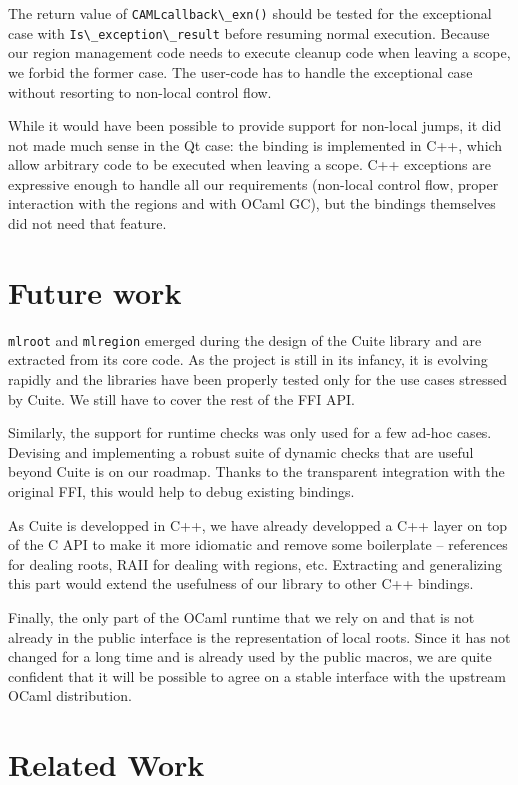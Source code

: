\documentclass[a4paper]{easychair}
\newcommand{\cpp}[1]{\lstinline[style=C++]{#1}}
\begin{document}
The return value of \cpp{CAMLcallback\_exn()} should be tested for
the exceptional case with \cpp{Is\_exception\_result} before resuming
normal execution.  Because our region management code needs to execute cleanup
code when leaving a scope, we forbid the former case. The user-code has to
handle the exceptional case without resorting to non-local control flow.

While it would have been possible to provide support for non-local
jumps, it did not made much sense in the Qt case: the binding is
implemented in C++, which allow arbitrary code to be executed when
leaving a scope. C++ exceptions are expressive enough to handle all our
requirements (non-local control flow, proper interaction with the
regions and with OCaml GC), but the bindings themselves did not need
that feature.

\section{Future work}

\cpp{mlroot} and \cpp{mlregion} emerged during the design of the Cuite library
and are extracted from its core code.  As the project is still in its infancy,
it is evolving rapidly and the libraries have been properly tested only for the
use cases stressed by Cuite. We still have to cover the rest of the FFI API.

Similarly, the support for runtime checks was only used for a few ad-hoc
cases. Devising and implementing a robust suite of dynamic checks that are
useful beyond Cuite is on our roadmap. Thanks to the transparent integration
with the original FFI, this would help to debug existing bindings.

As Cuite is developped in C++, we have already developped a C++ layer on top of
the C API to make it more idiomatic and remove some boilerplate -- references
for dealing roots, RAII for dealing with regions, etc. Extracting and
generalizing this part would extend the usefulness of our library to other C++
bindings.

Finally, the only part of the OCaml runtime that we rely on and that is not
already in the public interface is the representation of local roots. Since it
has not changed for a long time and is already used by the public macros,
we are quite confident that it will be possible to agree on a stable interface
with the upstream OCaml distribution. 

\section{Related Work}
\end{document}

